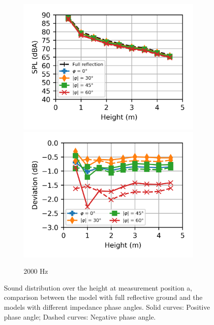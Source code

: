 \begin{figure}[H]\ContinuedFloat
	\begin{subfigure}[b]{\textwidth}
		\centering
		\includegraphics{fig/chap5/impedance/third_octave/SPL_2000_Hz.png}
		\hfill
		\includegraphics{fig/chap5/impedance/third_octave/deviation_2000_Hz.png}
		\caption{2000 Hz}
	\end{subfigure}

	\caption{Sound distribution over the height at measurement position a, comparison between the model with full reflective ground and the models with different impedance phase angles. Solid curves: Positive phase angle; Dashed curves: Negative phase angle.}
	\label{fig:third_octave_over_height_impedance}
\end{figure}

